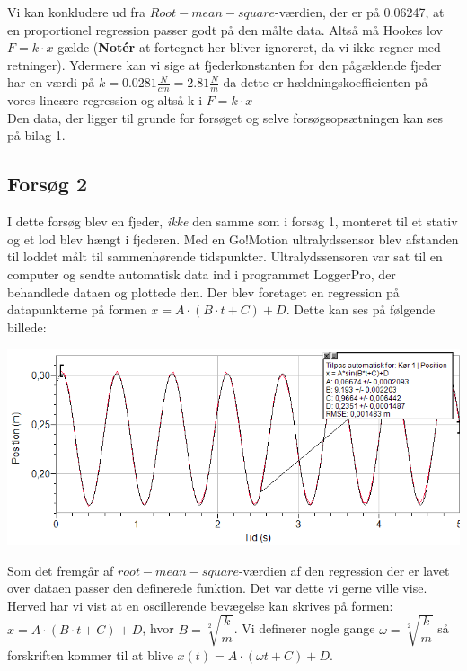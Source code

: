 Vi kan konkludere ud fra $Root-mean-square$-værdien, der er på 0.06247, at en proportionel regression passer godt på den målte data. Altså må Hookes lov $F=k \cdot x$ gælde (\textbf{Notér} at fortegnet her bliver ignoreret, da vi ikke regner med retninger). Ydermere kan vi sige at fjederkonstanten for den pågældende fjeder har en værdi på $k=0.0281\frac{N}{cm} = 2.81 \frac{N}{m}$ da dette er hældningskoefficienten på vores lineære regression og altså k i $F=k \cdot x$
\\

Den data, der ligger til grunde for forsøget og selve forsøgsopsætningen kan ses på bilag 1. 
\\

\subsection{Forsøg 2}
I dette forsøg blev en fjeder, \emph{ikke} den samme som i forsøg 1, monteret til et stativ og et lod blev hængt i fjederen. Med en Go!Motion ultralydssensor blev afstanden til loddet målt til sammenhørende tidspunkter. Ultralydssensoren var sat til en computer og sendte automatisk data ind i programmet LoggerPro, der behandlede dataen og plottede den. Der blev foretaget en regression på datapunkterne på formen $x = A \cdot (B \cdot t + C) + D$. Dette kan ses på følgende billede: 
\begin{center}
\includegraphics[scale=0.7]{Billeder/graf2}
\end{center}

Som det fremgår af $root-mean-square$-værdien af den regression der er lavet over dataen passer den definerede funktion. Det var dette vi gerne ville vise. Herved har vi vist at en oscillerende bevægelse kan skrives på formen: $x = A \cdot (B \cdot t + C) + D$, hvor $B=\sqrt[2]{\dfrac{k}{m}}$. Vi definerer nogle gange $\omega = \sqrt[2]{\dfrac{k}{m}}$ så forskriften kommer til at blive $x(t) = A \cdot (\omega t + C) + D$.
\\


